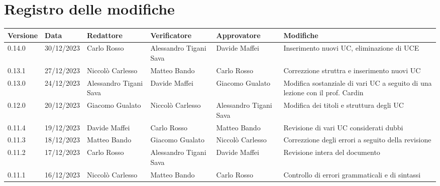 \section*{Registro delle modifiche}


\begin{table}[H]
	\centering
	\fontsize{10}{12}\selectfont
	\begin{tabularx}{\textwidth}{X|X|X|X|X|X}
		\textbf{Versione}     & \textbf{Data}        & \textbf{Redattore}     &
		\textbf{Verificatore} & \textbf{Approvatore} & \textbf{Modifiche}                                                                                                                    \\
		\toprule
		0.14.0	              & 30/12/2023            & Carlo Rosso            & Alessandro Tigani Sava & Davide Maffei            & Inserimento nuovi UC, eliminazione di UCE                                     \\
		\hline
		0.13.1	              & 27/12/2023           & Niccolò Carlesso       & Matteo Bando           & Carlo Rosso            & Correzzione struttra e inserimento nuovi UC                                     \\
		\hline
		0.13.0	              & 24/12/2023           & Alessandro Tigani Sava & Davide Maffei          & Giacomo Gualato        & Modifica sostanziale di vari UC a seguito di una lezione con il prof. Cardin                                     \\
		\hline
		0.12.0	              & 20/12/2023           & Giacomo Gualato        & Niccolò Carlesso       & Alessandro Tigani Sava & Modifica dei titoli e struttura degli UC                                     \\
		\hline
		0.11.4	              & 19/12/2023           & Davide Maffei          & Carlo Rosso            & Matteo Bando           & Revisione di vari UC considerati dubbi                                     \\
		\hline
		0.11.3                & 18/12/2023           & Matteo Bando           & Giacomo Gualato        & Niccolò Carlesso       & Correzzione degli errori a seguito della revisione                                     \\
		\hline
		0.11.2                & 17/12/2023           & Carlo Rosso            & Alessandro Tigani Sava & Davide Maffei          & Revisione intera del documento                                     \\
		\hline
		0.11.1                & 16/12/2023           & Niccolò Carlesso       & Matteo Bando           & Carlo Rosso            & Controllo di errori grammaticali e di sintassi                                     \\

\end{tabularx}
\end{table}
